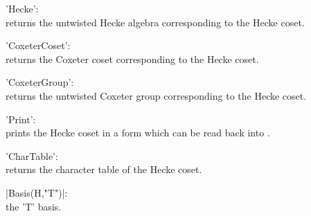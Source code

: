 'Hecke':\\ returns the untwisted Hecke algebra corresponding to the Hecke
     coset.

'CoxeterCoset':\\  returns the Coxeter coset   corresponding to the Hecke
     coset.

'CoxeterGroup':\\ returns the  untwisted  Coxeter group corresponding  to
     the Hecke coset.

'Print':\\ prints the Hecke  coset in a form  which can be read back into
     \GAP.

'CharTable':\\ returns the character table of the Hecke coset.

|Basis(H,"T")|:\\ the 'T' basis. 

